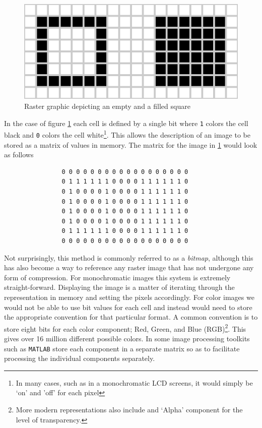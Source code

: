 \documentclass[authoryearcitations]{UoYCSproject}
\begin{document}
\begin{figure}[h]
  \centering
  \includegraphics[scale=1.0]{figures/rasterSquare.eps}
    \caption{Raster graphic depicting an empty and a filled square}
  \label{rasterSquare}
\end{figure}

In the case of figure \ref{rasterSquare} each cell is defined by a single bit where \verb+1+ colors the cell black and
\verb+0+ colors the cell white\footnote{In many cases, such as in a monochromatic LCD screens, it would simply be 
`on' and 'off' for each pixel}. This allows the description of an image to be stored as a matrix of values in memory. 
The matrix for the image in \ref{rasterSquare} would look as follows

\begin{verbatim}
                0 0 0 0 0 0 0 0 0 0 0 0 0 0 0 0 0 0
                0 1 1 1 1 1 1 0 0 0 0 1 1 1 1 1 1 0
                0 1 0 0 0 0 1 0 0 0 0 1 1 1 1 1 1 0
                0 1 0 0 0 0 1 0 0 0 0 1 1 1 1 1 1 0
                0 1 0 0 0 0 1 0 0 0 0 1 1 1 1 1 1 0
                0 1 0 0 0 0 1 0 0 0 0 1 1 1 1 1 1 0
                0 1 1 1 1 1 1 0 0 0 0 1 1 1 1 1 1 0
                0 0 0 0 0 0 0 0 0 0 0 0 0 0 0 0 0 0
\end{verbatim}

Not surprisingly, this method is commonly referred to as a \emph{bitmap}, although this has also become a way to 
reference any raster image that has not undergone any form of compression. 
For monochromatic images this system is extremely straight-forward. Displaying the image is a matter of iterating through
the representation in memory and setting the pixels accordingly. For color images we would not be able to use bit values for
each cell and instead would need to store the appropriate convention for that particular format. A common convention is to store
eight bits for each color component; Red, Green, and Blue (RGB)\footnote{More modern representations also include and `Alpha'
component for the level of transparency.}. This gives over 16 million different possible colors. In some image processing
toolkits such as \verb+MATLAB+ store each component in a separate matrix so as to facilitate processing the individual components
separately. 
\end{document}

